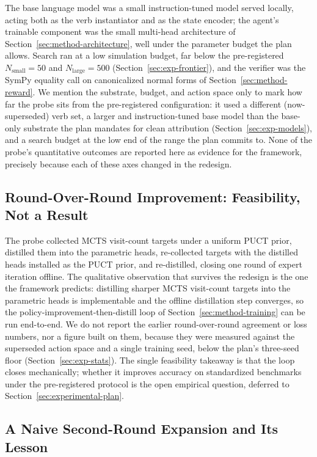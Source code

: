 The base language model was a small instruction-tuned model served locally,
acting both as the verb instantiator and as the state encoder; the agent's
trainable component was the small multi-head architecture of
Section~\ref{sec:method-architecture}, well under the parameter budget the plan
allows. Search ran at a low simulation budget, far below the pre-registered
$N_{\mathrm{small}} = 50$ and $N_{\mathrm{large}} = 500$
(Section~\ref{sec:exp-frontier}), and the verifier was the SymPy equality call
on canonicalized normal forms of Section~\ref{sec:method-reward}. We mention the
substrate, budget, and action space only to mark how far the probe sits from the
pre-registered configuration: it used a different (now-superseded) verb set, a
larger and instruction-tuned base model than the base-only substrate the plan
mandates for clean attribution (Section~\ref{sec:exp-models}), and a search
budget at the low end of the range the plan commits to. None of the probe's
quantitative outcomes are reported here as evidence for the framework, precisely
because each of these axes changed in the redesign.

\subsection{Round-Over-Round Improvement: Feasibility, Not a Result}
\label{sec:pilot-v2-v3}

The probe collected MCTS visit-count targets under a uniform PUCT prior,
distilled them into the parametric heads, re-collected targets with the
distilled heads installed as the PUCT prior, and re-distilled, closing one round
of expert iteration offline. The qualitative observation that survives the
redesign is the one the framework predicts: distilling sharper MCTS visit-count
targets into the parametric heads is implementable and the offline distillation
step converges, so the policy-improvement-then-distill loop of
Section~\ref{sec:method-training} can be run end-to-end. We do not report the
earlier round-over-round agreement or loss numbers, nor a figure built on them,
because they were measured against the superseded action space and a single
training seed, below the plan's three-seed floor (Section~\ref{sec:exp-stats}).
The single feasibility takeaway is that the loop closes mechanically; whether it
improves accuracy on standardized benchmarks under the pre-registered protocol
is the open empirical question, deferred to Section~\ref{sec:experimental-plan}.

\subsection{A Naive Second-Round Expansion and Its Lesson}
\label{sec:pilot-v3-v4}

